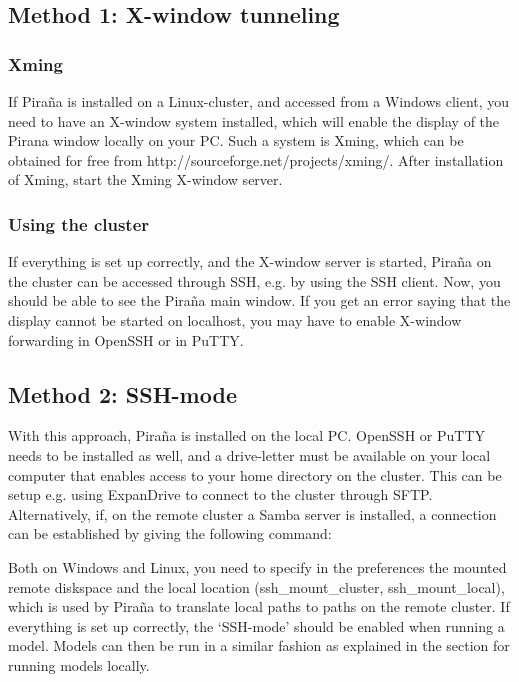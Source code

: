 \documentclass[a4,11pt]{report} \usepackage[pdftex]{graphicx}
\begin{document}
{\subsection{Method 1: X-window tunneling}

\subsubsection*{Xming}
If Pira\~na is installed on a Linux-cluster, and accessed from a
Windows client, you need to have an X-window system installed, which
will enable the display of the Pirana window locally on your PC. Such
a system is Xming, which can be obtained for free from
http://sourceforge.net/projects/xming/. After installation of Xming,
start the Xming X-window server.

\subsubsection*{Using the cluster}
If everything is set up correctly, and the X-window server is started,
Pira\~na on the cluster can be accessed through SSH, e.g. by using the
SSH client. Now, you should be able to see the Pira\~na main
window. If you get an error saying that the display cannot be started
on localhost, you may have to enable X-window forwarding in OpenSSH or in
PuTTY.

\subsection{Method 2: SSH-mode}

With this approach, Pira\~na is installed on the local PC. OpenSSH or
PuTTY needs to be installed as well, and a drive-letter must be
available on your local computer that enables access to your home
directory on the cluster. This can be setup e.g. using ExpanDrive to
connect to the cluster through SFTP. Alternatively, if, on the remote
cluster a Samba server is installed, a connection can be established
by giving the following command:

\vspace{6pt} \normalfont \vspace{6pt}

\noindent Both on Windows and Linux, you need to specify in the
preferences the mounted remote diskspace and the local location
(ssh\_mount\_cluster, ssh\_mount\_local), which is used by Pira\~na to
translate local paths to paths on the remote cluster.  If everything
is set up correctly, the `SSH-mode' should be enabled when running a
model. Models can then be run in a similar fashion as explained in the
section for running models locally.

}
\end{document}
